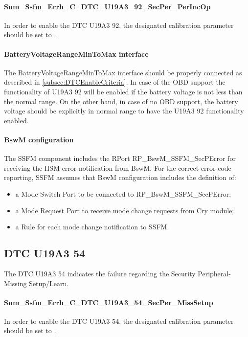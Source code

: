 \paragraph{Sum\_Ssfm\_Errh\_C\_DTC\_U19A3\_92\_SecPer\_PerIncOp}
In order to enable the DTC U19A3 92, the designated calibration parameter should be set to .

\paragraph{BatteryVoltageRangeMinToMax interface}
The BatteryVoltageRangeMinToMax interface should be properly connected as described in \ref{subsec:DTCEnableCriteria}. In case of the OBD support the
functionality of U19A3 92 will be enabled if the battery voltage is not less than the normal range. On the other hand, in case of no OBD support, the
battery voltage should be explicitly in normal range to have the U19A3 92 functionality enabled.

\paragraph{BswM configuration}
The SSFM component includes the RPort RP\_BswM\_SSFM\_SecPError for receiving the HSM error notification from BswM.
For the correct error code reporting, SSFM assumes that BswM configuration includes the definition of:

\begin{itemize}
	\item a Mode Switch Port to be connected to RP\_BswM\_SSFM\_SecPError;
	\item a Mode Request Port to receive mode change requests from Cry module;
	\item a Rule for each mode change notification to SSFM.
\end{itemize}

\subsection{DTC U19A3 54}
\label{subsubsec:SSFMERRHDTCU19A354Handler}
The DTC U19A3 54 indicates the failure regarding the Security Peripheral-Missing Setup/Learn.

\paragraph{Sum\_Ssfm\_Errh\_C\_DTC\_U19A3\_54\_SecPer\_MissSetup }
In order to enable the DTC U19A3 54, the designated calibration parameter should be set to .

